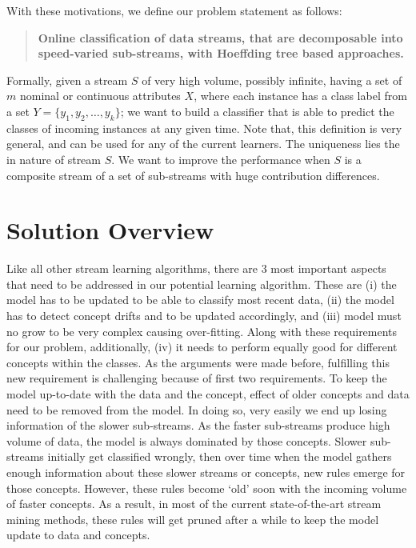 With these motivations, we define our problem statement as follows:

\begin{quotation}
    \textbf{Online classification of data streams, that are decomposable into speed-varied sub-streams, with Hoeffding tree based approaches.}
\end{quotation}

\noindent Formally, given a stream $S$ of very high volume, possibly infinite, having a set of $m$ nominal or continuous attributes $X$, where each instance has a class label from a set $Y = \{y_1, y_2, \dots, y_k\}$; we want to build a classifier that is able to predict the classes of incoming instances at any given time. Note that, this definition is very general, and can be used for any of the current learners. The uniqueness lies the in nature of stream $S$. We want to improve the performance when $S$ is a composite stream of a set of sub-streams with huge contribution differences.


\section{Solution Overview}
Like all other stream learning algorithms, there are 3 most important aspects that need  to be addressed in our potential learning algorithm. These are (i) the model has to be updated to be able to classify most recent data, (ii) the model has to detect concept drifts and to be updated accordingly, and (iii) model must no grow to be very complex causing over-fitting. Along with these requirements for our problem, additionally, (iv) it needs to perform equally good for different concepts within the classes. As the arguments were made before, fulfilling this new requirement is challenging because of first two requirements. To keep the model up-to-date with the data and the concept, effect of older concepts and data need to be removed from the model. In doing so, very easily we end up losing information of the slower sub-streams. As the faster sub-streams produce high volume of data, the model is always dominated by those concepts. Slower sub-streams initially get classified wrongly, then over time when the model gathers enough information about these slower streams or concepts, new rules emerge for those concepts. However, these rules become `old'  soon with the incoming volume of faster concepts. As a result, in most of the current state-of-the-art stream mining methods, these rules will get pruned after a while to keep the model update to data and concepts.

